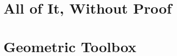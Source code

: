 \documentclass{book}
\date{\today}
\begin{document}
\maketitle

\frontmatter




\mainmatter



\part{All of It, Without Proof}


\part{Geometric Toolbox}\label{sec:preliminaries}


\appendix


%
%

\backmatter
{}
{}


{}
\listoftheorems
\end{document}
